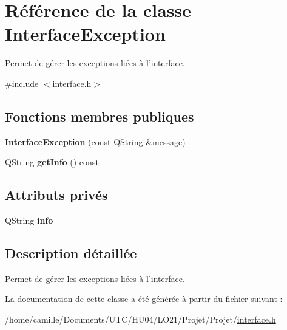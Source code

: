 \hypertarget{class_interface_exception}{\section{Référence de la classe Interface\-Exception}
\label{class_interface_exception}
}


Permet de gérer les exceptions liées à l'interface.  




{\ttfamily \#include $<$interface.\-h$>$}

\subsection*{Fonctions membres publiques}
\begin{DoxyCompactItemize}
\item 
\hypertarget{class_interface_exception_a94c63025ff679efa69cf8878c3a34dad}{{\bfseries Interface\-Exception} (const Q\-String \&message)}\label{class_interface_exception_a94c63025ff679efa69cf8878c3a34dad}

\item 
\hypertarget{class_interface_exception_a1c0925063de4c7377fd1502c0470eb49}{Q\-String {\bfseries get\-Info} () const }\label{class_interface_exception_a1c0925063de4c7377fd1502c0470eb49}

\end{DoxyCompactItemize}
\subsection*{Attributs privés}
\begin{DoxyCompactItemize}
\item 
\hypertarget{class_interface_exception_a352de63c3f5105468e0129cdcdee48ee}{Q\-String {\bfseries info}}\label{class_interface_exception_a352de63c3f5105468e0129cdcdee48ee}

\end{DoxyCompactItemize}


\subsection{Description détaillée}
Permet de gérer les exceptions liées à l'interface. 

La documentation de cette classe a été générée à partir du fichier suivant \-:\begin{DoxyCompactItemize}
\item 
/home/camille/\-Documents/\-U\-T\-C/\-H\-U04/\-L\-O21/\-Projet/\-Projet/\hyperlink{interface_8h}{interface.\-h}\end{DoxyCompactItemize}

